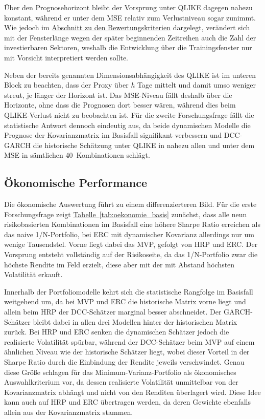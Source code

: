 \documentclass[a4paper, 12pt]{article}
\begin{document}
Über den Prognosehorizont bleibt der Vorsprung unter QLIKE dagegen nahezu konstant, während er unter dem MSE relativ zum Verlustniveau sogar zunimmt.
Wie jedoch im \hyperref[sec:kriterien]{Abschnitt zu den Bewertungskriterien} dargelegt, verändert sich mit der Fensterlänge wegen der später beginnenden Zeitreihen auch die Zahl der investierbaren Sektoren, weshalb die Entwicklung über die Trainingsfenster nur mit Vorsicht interpretiert werden sollte.



Neben der bereits genannten Dimensionsabhängigkeit des QLIKE ist im unteren Block zu beachten, dass der Proxy über $h$ Tage mittelt und damit umso weniger streut, je länger der Horizont ist.
Das MSE-Niveau fällt deshalb über die Horizonte, ohne dass die Prognosen dort besser wären, während dies beim QLIKE-Verlust nicht zu beobachten ist.
Für die zweite Forschungsfrage fällt die statistische Antwort dennoch eindeutig aus, da beide dynamischen Modelle die Prognose der Kovarianzmatrix im Basisfall signifikant verbessern und DCC-GARCH die historische Schätzung unter QLIKE in nahezu allen und unter dem MSE in sämtlichen 40~Kombinationen schlägt.

\subsection{Ökonomische Performance}\label{sec:oekonomisch}
Die ökonomische Auswertung führt zu einem differenzierteren Bild.
Für die erste Forschungsfrage zeigt \hyperref[tab:oekonomie_basis]{Tabelle~\ref*{tab:oekonomie_basis}} zunächst, dass alle neun risikobasierten Kombinationen im Basisfall eine höhere Sharpe Ratio erreichen als das naive 1/N-Portfolio, bei ERC mit dynamischer Kovarianz allerdings nur um wenige Tausendstel.
Vorne liegt dabei das MVP, gefolgt von HRP und ERC.
Der Vorsprung entsteht vollständig auf der Risikoseite, da das 1/N-Portfolio zwar die höchste Rendite im Feld erzielt, diese aber mit der mit Abstand höchsten Volatilität erkauft.



%

Innerhalb der Portfoliomodelle kehrt sich die statistische Rangfolge im Basisfall weitgehend um, da bei MVP und ERC die historische Matrix vorne liegt und allein beim HRP der DCC-Schätzer marginal besser abschneidet.
Der GARCH-Schätzer bleibt dabei in allen drei Modellen hinter der historischen Matrix zurück.
Bei HRP und ERC senken die dynamischen Schätzer jedoch die realisierte Volatilität spürbar, während der DCC-Schätzer beim MVP auf einem ähnlichen Niveau wie der historische Schätzer liegt, wobei dieser Vorteil in der Sharpe Ratio durch die Einbindung der Rendite jeweils verschwindet.
Genau diese Größe schlagen \textcite{engle2006} für das Minimum-Varianz-Portfolio als ökonomisches Auswahlkriterium vor, da dessen realisierte Volatilität unmittelbar von der Kovarianzmatrix abhängt und nicht von den Renditen überlagert wird.
Diese Idee kann auch auf HRP und ERC übertragen werden, da deren Gewichte ebenfalls allein aus der Kovarianzmatrix stammen.
\end{document}

